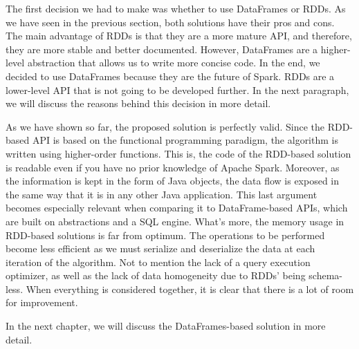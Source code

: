 The first decision we had to make was whether to use DataFrames or RDDs. As we have seen in the previous section, both solutions have their pros and cons. The main advantage of RDDs is that they are a more mature API, and therefore, they are more stable and better documented. However, DataFrames are a higher-level abstraction that allows us to write more concise code. In the end, we decided to use DataFrames because they are the future of Spark. RDDs are a lower-level API that is not going to be developed further. In the next paragraph, we will discuss the reasons behind this decision in more detail.

As we have shown so far, the proposed solution is perfectly valid. Since the RDD-based API is based on the functional programming paradigm, the algorithm is written using higher-order functions. This is, the code of the RDD-based solution is readable even if you have no prior knowledge of Apache Spark. Moreover, as the information is kept in the form of Java objects, the data flow is exposed in the same way that it is in any other Java application. This last argument becomes especially relevant when comparing it to DataFrame-based APIs, which are built on abstractions and a SQL engine. What's more, the memory usage in RDD-based solutions is far from optimum. The operations to be performed become less efficient as we must serialize and deserialize the data at each iteration of the algorithm. Not to mention the lack of a query execution optimizer, as well as the lack of data homogeneity due to RDDs' being schema-less. When everything is considered together, it is clear that there is a lot of room for improvement.

In the next chapter, we will discuss the DataFrames-based solution in more detail.
